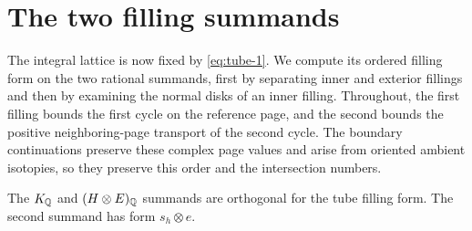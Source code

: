 \section{The two filling summands}\label{sec:filling-summands}

The integral lattice is now fixed by \eqref{eq:tube-1}. We compute
its ordered filling form on the two rational summands, first by
separating inner and exterior fillings and then by examining the
normal disks of an inner filling. Throughout, the first filling
bounds the first cycle on the reference page, and the second bounds
the positive neighboring-page transport of the second cycle. The boundary continuations
preserve these complex page values and arise from oriented ambient
isotopies, so they preserve this order and the intersection numbers.

\begin{lemma}\label{lem:exterior}
The \(K_\mathbb Q\) and \((H\otimes E)_\mathbb Q\) summands are
orthogonal for the tube filling form. The
second summand has form \(s_h\otimes e\).
\end{lemma}
